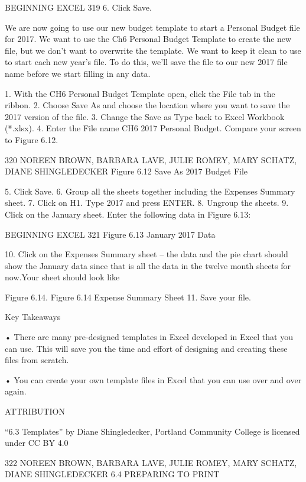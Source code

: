 BEGINNING EXCEL 319
6. Click Save.



We are now going to use our new budget template to start a Personal Budget file for 2017. We want
to use the Ch6 Personal Budget Template to create the new file, but we don’t want to overwrite the
template. We want to keep it clean to use to start each new year’s file. To do this, we’ll save the file to
our new 2017 file name before we start filling in any data.

1.   With the CH6 Personal Budget Template open, click the File tab in the ribbon.
2.   Choose Save As and choose the location where you want to save the 2017 version of the file.
3.   Change the Save as Type back to Excel Workbook (*.xlsx).
4.   Enter the File name CH6 2017 Personal Budget. Compare your screen to Figure 6.12.




320 NOREEN BROWN, BARBARA LAVE, JULIE ROMEY, MARY SCHATZ, DIANE SHINGLEDECKER
Figure 6.12 Save As 2017 Budget File


5.   Click Save.
6.   Group all the sheets together including the Expenses Summary sheet.
7.   Click on H1. Type 2017 and press ENTER.
8.   Ungroup the sheets.
9.   Click on the January sheet. Enter the following data in Figure 6.13:


BEGINNING EXCEL 321
Figure 6.13 January 2017 Data


10. Click on the Expenses Summary sheet – the data and the pie chart should show the January
data since that is all the data in the twelve month sheets for now.Your sheet should look like




Figure 6.14.                                                                             Figure 6.14 Expense
Summary Sheet
11. Save your file.


Key Takeaways


• There are many pre-designed templates in Excel developed in Excel that you can use. This will save you the
time and effort of designing and creating these files from scratch.

• You can create your own template files in Excel that you can use over and over again.



ATTRIBUTION

“6.3 Templates” by Diane Shingledecker, Portland Community College is licensed under CC BY 4.0

322 NOREEN BROWN, BARBARA LAVE, JULIE ROMEY, MARY SCHATZ, DIANE SHINGLEDECKER
6.4 PREPARING TO PRINT




